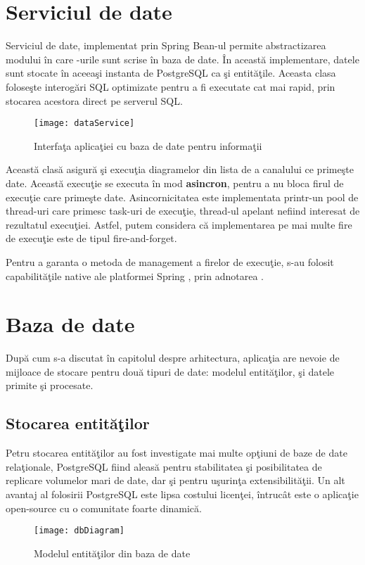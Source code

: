 \section{Serviciul de date}
Serviciul de date, implementat prin Spring Bean-ul  permite abstractizarea modului în care -urile sunt scrise în baza de date. În această implementare, datele sunt stocate în aceeaşi instanta de PostgreSQL ca şi entităţile. Aceasta clasa foloseşte interogări SQL optimizate pentru a fi executate cat mai rapid, prin stocarea acestora direct pe serverul SQL.
\begin{figure}[H]
	\centering
	\texttt{[image: dataService]}
	\caption{Interfaţa aplicaţiei cu baza de date pentru informaţii}
	\label{fig:dataService}
\end{figure}
Această clasă asigură şi execuţia diagramelor din lista de  a canalului ce primeşte date. Această execuţie se executa în mod \textbf{asincron}, pentru a nu bloca firul de execuţie care primeşte date. Asincornicitatea este implementata printr-un pool de thread-uri care primesc task-uri de execuţie, thread-ul apelant nefiind interesat de rezultatul execuţiei. Astfel, putem considera că implementarea pe mai multe fire de execuţie este de tipul fire-and-forget.

Pentru a garanta o metoda de management a firelor de execuţie, s-au folosit capabilităţile native ale platformei Spring \autocite{springAsync} , prin adnotarea .
\section{Baza de date}

După cum s-a discutat în capitolul despre arhitectura, aplicaţia are nevoie de mijloace de stocare pentru două tipuri de date: modelul entităţilor, şi datele primite şi procesate.
\subsection{Stocarea entităţilor} 
Petru stocarea entităţilor au fost investigate mai multe opţiuni de baze de date relaţionale, PostgreSQL fiind aleasă pentru stabilitatea şi posibilitatea de replicare volumelor mari de date, dar şi pentru uşurinţa extensibilităţii\autocite{postgresql}. Un alt avantaj al folosirii PostgreSQL este lipsa costului licenţei, întrucât este o aplicaţie open-source cu o comunitate foarte dinamică.
\begin{landscape}
	\begin{figure}
		\centering
		\texttt{[image: dbDiagram]}
		\caption{Modelul entităţilor din baza de date}
		\label{fig:dbDiagram}
	\end{figure}
\end{landscape}

